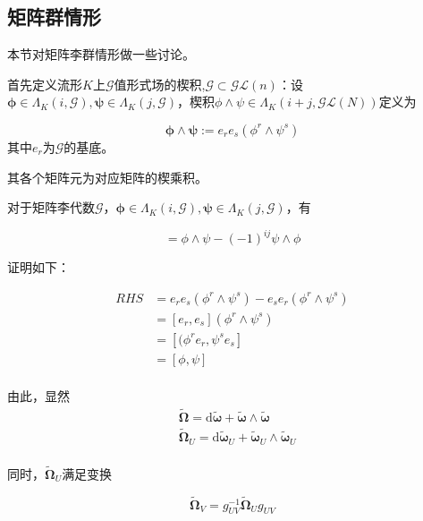 \documentclass{ctexbook}
\begin{document}
\subsection{矩阵群情形}

本节对矩阵李群情形做一些讨论。    

首先定义流形$K$上$\mathscr{G}$值形式场的楔积,$\mathscr{G}\subset\mathscr{GL}(n)$：设$\bm{\phi}\in\Lambda_K(i,\mathscr{G}),\bm{\psi}\in\Lambda_K(j,\mathscr{G})$，楔积$\phi\wedge\psi\in\Lambda_K\left(i+j,\mathscr{GL}(N)\right)$定义为

\begin{equation}
    \bm{\phi}\wedge\bm{\psi}:=e_r e_s(\phi^r\wedge\psi^s)
\end{equation}
其中$e_r$为$\mathscr{G}$的基底。

其各个矩阵元为对应矩阵的楔乘积。

对于矩阵李代数$\mathscr{G}$，$\bm{\phi}\in\Lambda_K(i,\mathscr{G}),\bm{\psi}\in\Lambda_K(j,\mathscr{G})$，有

\begin{equation}
    [\phi,\psi]=\phi\wedge\psi-(-1)^{i j}\psi\wedge\phi
\end{equation}

证明如下：

\begin{equation}
    \begin{split}
        RHS
        &=e_r e_s(\phi^r\wedge\psi^s)-e_s e_r(\phi^r\wedge\psi^s)\\
        &=[e_r,e_s](\phi^r\wedge\psi^s)\\
        &=[(\phi^re_r,\psi^se_s]\\
        &=[\phi,\psi]\\
    \end{split}
\end{equation}


由此，显然
\begin{equation}
    \begin{split}
        &\tilde{\bm{\Omega}}=\mathrm{d}\tilde{\bm{\omega}}+\tilde{\bm{\omega}}\wedge\tilde{\bm{\omega}}\\
        &\tilde{\bm{\Omega}}_U=\mathrm{d}\tilde{\bm{\omega}}_U+\tilde{\bm{\omega}}_U\wedge\tilde{\bm{\omega}}_U\\
    \end{split}
\end{equation}

同时，$\tilde{\bm{\Omega}}_U$满足变换

\begin{equation}
    \tilde{\bm{\Omega}}_V=g_{UV}^{-1}\tilde{\bm{\Omega}}_U g_{UV}
\end{equation}
\end{document}
